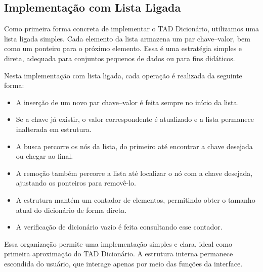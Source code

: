 \subsection{Implementação com Lista Ligada}

Como primeira forma concreta de implementar o TAD Dicionário, utilizamos uma lista ligada simples. 
Cada elemento da lista armazena um par chave–valor, bem como um ponteiro para o próximo elemento. Essa é uma estratégia simples e direta, adequada para conjuntos pequenos de dados ou para fins didáticos.

Nesta implementação com lista ligada, cada operação é realizada da seguinte forma:

\begin{itemize}
\item A inserção de um novo par chave–valor é feita sempre no início da lista.
\item Se a chave já existir, o valor correspondente é atualizado e a lista permanece inalterada em estrutura.
\item A busca percorre os nós da lista, do primeiro até encontrar a chave desejada ou chegar ao final.
\item A remoção também percorre a lista até localizar o nó com a chave desejada, ajustando os ponteiros para removê-lo.
\item A estrutura mantém um contador de elementos, permitindo obter o tamanho atual do dicionário de forma direta.
\item A verificação de dicionário vazio é feita consultando esse contador.
\end{itemize}

Essa organização permite uma implementação simples e clara, ideal como primeira aproximação do TAD Dicionário. 
A estrutura interna permanece escondida do usuário, que interage apenas por meio das funções da interface.

